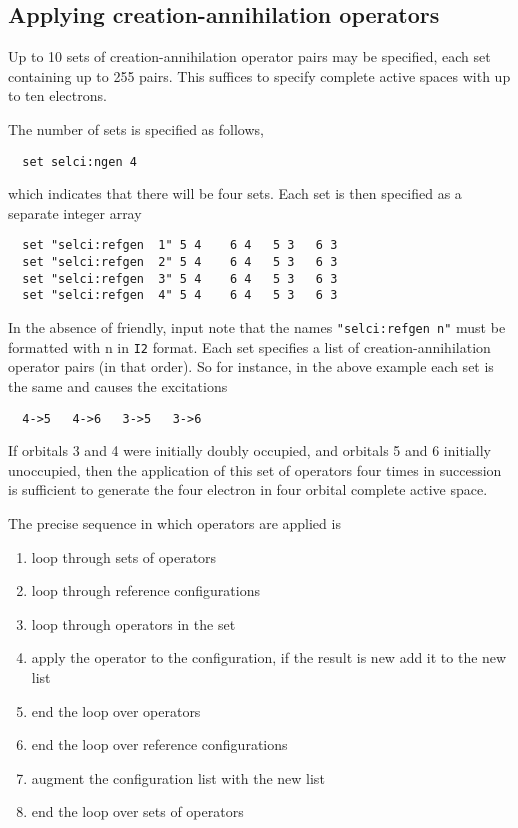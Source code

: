 \subsection{Applying creation-annihilation operators}

Up to 10 sets of creation-annihilation operator pairs may be
specified, each set containing up to 255 pairs.  This suffices to
specify complete active spaces with up to ten electrons.

The number of sets is specified as follows,
\begin{verbatim}
  set selci:ngen 4
\end{verbatim}
which indicates that there will be four sets.  Each set is then
specified as a separate integer array
\begin{verbatim}
  set "selci:refgen  1" 5 4    6 4   5 3   6 3  
  set "selci:refgen  2" 5 4    6 4   5 3   6 3  
  set "selci:refgen  3" 5 4    6 4   5 3   6 3  
  set "selci:refgen  4" 5 4    6 4   5 3   6 3  
\end{verbatim}
In the absence of friendly, input note that the names
\verb+"selci:refgen n"+ must be formatted with n in \verb+I2+
format. Each set specifies a list of creation-annihilation operator
pairs (in that order).  So for instance, in the above example each set
is the same and causes the excitations
\begin{verbatim}
  4->5   4->6   3->5   3->6
\end{verbatim}
If orbitals 3 and 4 were initially doubly occupied, and orbitals 5 and
6 initially unoccupied, then the application of this set of operators
four times in succession is sufficient to generate the four electron
in four orbital complete active space.

The precise sequence in which operators are applied is
\begin{enumerate}
\item loop through sets of operators
\item loop through reference configurations
\item loop through operators in the set
\item apply the operator to the configuration, if the result is new add it
  to the new list
\item end the loop over operators
\item end the loop over reference configurations
\item augment the configuration list with the new list
\item end the loop over sets of operators
\end{enumerate}

